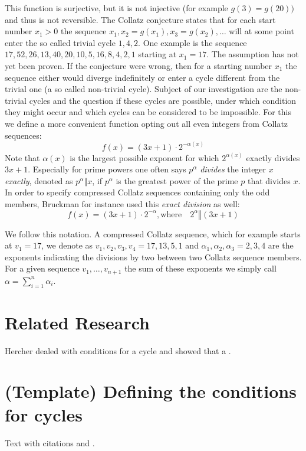 This function is surjective, but it is not injective (for example $g(3)=g(20))$ and thus is not reversible. The Collatz conjecture states that for each start number $x_1>0$ the sequence $x_1,x_2=g(x_1),x_3=g(x_2),\ldots$ will at some point enter the so called trivial cycle $1,4,2$. One example is the sequence $17,52,26,13,40,20,10,5,16,8,4,2,1$ starting at $x_1=17$. The assumption has not yet been proven. If the conjecture were wrong, then for a starting number $x_1$ the sequence either would diverge indefinitely or enter a cycle different from the trivial one (a so called non-trivial cycle). Subject of our investigation are the non-trivial cycles and the question if these cycles are possible, under which condition they might occur and which cycles can be considered to be impossible.
For this we define a more convenient function opting out all even integers from Collatz sequences:
\begin{equation}
\label{eq:func_collatz_odd}
f(x)=(3x+1)\cdot2^{-\alpha(x)}
\end{equation}
Note that $\alpha(x)$ is the largest possible exponent for which $2^{\alpha(x)}$ exactly divides $3x+1$. Especially for prime powers one often says $p^\alpha$ \textit{divides} the integer $x$ \textit{exactly}, denoted as $p^\alpha\mathrel\Vert x$, if $p^\alpha$ is the greatest power of the prime $p$ that divides $x$. In order to specify compressed Collatz sequences containing only the odd members, Bruckman \cite{Ref_Bruckman_2008} for instance used this \textit{exact division} as well:
\begin{equation*}
f(x)=(3x+1)\cdot2^{-\alpha},\text{where}\hspace{1em}2^\alpha\mathrel\Vert(3x+1)
\end{equation*}

We follow this notation. A compressed Collatz sequence, which for example starts at $v_1=17$, we denote as $v_1,v_2,v_3,v_4=17,13,5,1$ and $\alpha_1,\alpha_2,\alpha_3=2,3,4$ are the exponents indicating the divisions by two between two Collatz sequence members. For a given sequence $v_1,\ldots,v_{n+1}$ the sum of these exponents we simply call $\alpha=\sum_{i=1}^{n}\alpha_i$.

\section{Related Research}
\label{sec:1}
Hercher \cite{Ref_Hercher_2018} dealed with conditions for a cycle and showed that a .

\section{(Template) Defining the conditions for cycles}
\label{sec:1}
Text with citations \cite{RefB} and \cite{RefJ}.
